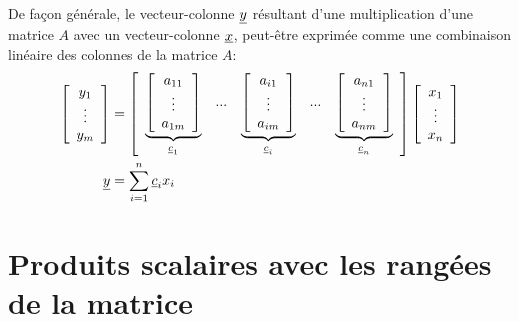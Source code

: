 De façon générale, le vecteur-colonne $\underline{y}$ résultant d'une multiplication d'une matrice $A$ avec un vecteur-colonne $\underline{x}$, peut-être exprimée comme une combinaison linéaire des colonnes de la matrice $A$:
%
\begin{align}
%
	\left[ \begin{array}{c}
			   y_1 \\ \vdots \\ y_m
	\end{array} \right]
%
	&=
%
	\left[ \begin{array}{c c c c c}
			   \underbrace{\left[ \begin{array}{c}
									  a_{11} \\ \vdots \\ a_{1m}
			   \end{array} \right]}_{\col{c}_1}
			   & ... &
			   \underbrace{\left[ \begin{array}{c}
									  a_{i1} \\ \vdots \\ a_{im}
			   \end{array} \right]}_{\col{c}_i}
			   & ... &
			   \underbrace{\left[ \begin{array}{c}
									  a_{n1} \\ \vdots \\ a_{nm}
			   \end{array} \right]}_{\col{c}_n}
	\end{array} \right]
%
	\left[ \begin{array}{c}
			   x_1 \\ \vdots \\ x_n
	\end{array} \right]  \\
%
%
	\col{y}
	&= \sum_{i=1}^{n}{ \col{c}_i x_i}
\end{align}
%

\section{Produits scalaires avec les rangées de la matrice}
\label{sec:combveccol}

